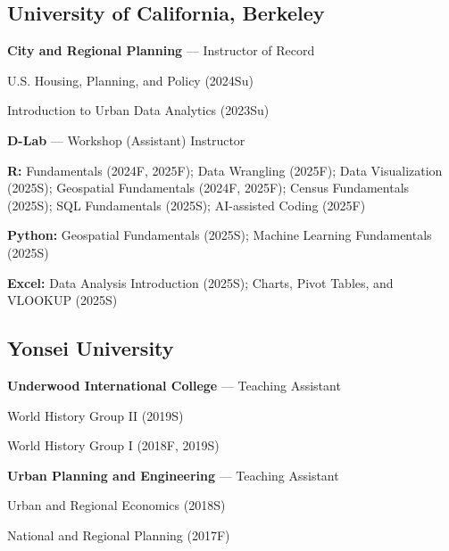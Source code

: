 \documentclass[11pt,letterpaper]{article}
\newcommand{\term}[1]{(#1)}
\begin{document}
\subsection*{University of California, Berkeley}
\begin{subpoints}
  \item \textbf{City and Regional Planning} — Instructor of Record
    \begin{subpoints2}
      \item U.S. Housing, Planning, and Policy \term{2024Su}
      \item Introduction to Urban Data Analytics \term{2023Su}
    \end{subpoints2}
  \item \textbf{D-Lab} — Workshop (Assistant) Instructor
    \begin{subpoints2}
      \item \textbf{R:} Fundamentals \term{2024F, 2025F}; Data Wrangling \term{2025F}; Data Visualization \term{2025S}; Geospatial Fundamentals \term{2024F, 2025F}; Census Fundamentals \term{2025S}; SQL Fundamentals \term{2025S}; AI-assisted Coding \term{2025F}
      \item \textbf{Python:} Geospatial Fundamentals \term{2025S}; Machine Learning Fundamentals \term{2025S}
      \item \textbf{Excel:} Data Analysis Introduction \term{2025S}; Charts, Pivot Tables, and VLOOKUP \term{2025S}
    \end{subpoints2}
\end{subpoints}

\subsection*{Yonsei University}
\begin{subpoints}
  \item \textbf{Underwood International College} — Teaching Assistant
    \begin{subpoints2}
      \item World History Group II \term{2019S}
      \item World History Group I \term{2018F, 2019S}
    \end{subpoints2}
  \item \textbf{Urban Planning and Engineering} — Teaching Assistant
    \begin{subpoints2}
      \item Urban and Regional Economics \term{2018S}
      \item National and Regional Planning \term{2017F}
    \end{subpoints2}
\end{subpoints}
\end{document}
